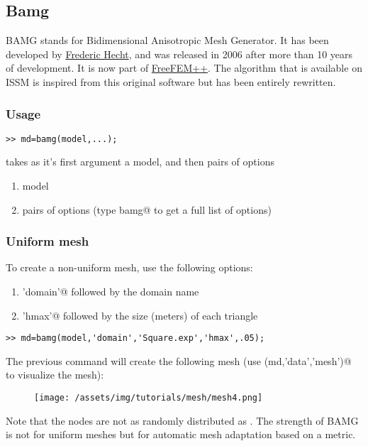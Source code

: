 \subsection{Bamg}%
BAMG stands for Bidimensional Anisotropic Mesh Generator. It has been developed by \href{http://www.ann.jussieu.fr/hecht/}{Frederic Hecht}, and was released in 2006 after more than 10 years of development. It is now part of \href{http://www.freefem.org/ff++/}{FreeFEM++}. The algorithm that is available on ISSM is inspired from this original software but has been entirely rewritten.
\subsubsection{Usage}%
\begin{verbatim}>> md=bamg(model,...);\end{verbatim}
\verb@bamg@ takes as it's first argument a model, and then pairs of options
\begin{enumerate}
	\item model
	\item pairs of options (type \verb@help bamg@ to get a full list of options)
\end{enumerate}
\subsubsection{Uniform mesh}%
To create a non-uniform mesh, use the following options:
\begin{enumerate}
	\item \verb@'domain'@ followed by the domain name
	\item \verb@'hmax'@ followed by the size (meters) of each triangle
\end{enumerate}
\begin{verbatim}>> md=bamg(model,'domain','Square.exp','hmax',.05);\end{verbatim}
The previous command will create the following mesh (use \verb@plotmodel(md,'data','mesh')@ to visualize the mesh):
\begin{figure}[H]
	\begin{center}
		\texttt{[image: /assets/img/tutorials/mesh/mesh4.png]}
	\end{center}
\end{figure}
Note that the nodes are not as randomly distributed as \verb@triangle@. The strength of BAMG is not for uniform meshes but for automatic mesh adaptation based on a metric.
